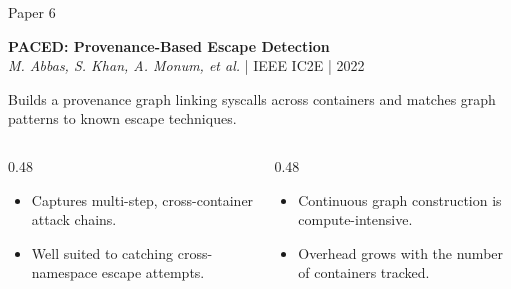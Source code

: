 \documentclass[aspectratio=169,11pt]{beamer}
\begin{document}
\begin{frame}{Paper 6}
\vspace{0.4cm}
\begin{center}
{\Large\bfseries PACED: Provenance-Based Escape Detection}\\[0.15cm]
{\small\color{DarkGray}\textit{M. Abbas, S. Khan, A. Monum, et al.} | IEEE IC2E | 2022}
\end{center}

\vspace{0.2cm}
{\small Builds a provenance graph linking syscalls across containers and matches graph patterns to known escape techniques.}

\vspace{0.2cm}
\begin{columns}[T,onlytextwidth]
\begin{column}{0.48\textwidth}
\begin{tcolorbox}[colback=green!5,colframe=green!50!black,title={\textcolor{green!50!black}{\faCheckCircle}~Where It Wins},fonttitle=\bfseries\small,boxrule=0.5pt,arc=2mm,left=2mm,right=2mm,top=1mm,bottom=1mm]
\footnotesize
\begin{itemize}
  \item Captures multi-step, cross-container attack chains.
  \item Well suited to catching cross-namespace escape attempts.
\end{itemize}
\end{tcolorbox}
\end{column}

\begin{column}{0.48\textwidth}
\begin{tcolorbox}[colback=red!5,colframe=red!50!black,title={\textcolor{red}{\faTimesCircle}~Where It Struggles},fonttitle=\bfseries\small,boxrule=0.5pt,arc=2mm,left=2mm,right=2mm,top=1mm,bottom=1mm]
\footnotesize
\begin{itemize}
  \item Continuous graph construction is compute-intensive.
  \item Overhead grows with the number of containers tracked.
\end{itemize}
\end{tcolorbox}
\end{column}
\end{columns}
\end{frame}
\end{document}
